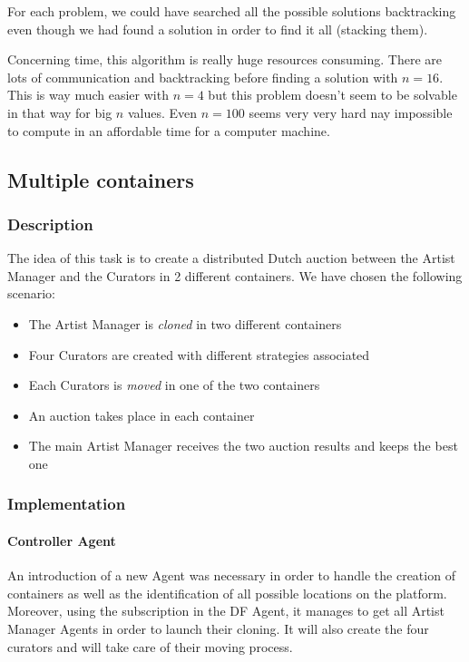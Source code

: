 \documentclass[a4paper,11pt]{article}
\begin{document}
For each problem, we could have searched all the possible solutions backtracking even 
though we had found a solution in order to find it all (stacking them).
  
Concerning time, this algorithm is really huge resources consuming. There are lots of 
communication and backtracking before finding a solution with $n = 16$. This is way much 
easier with $n = 4$ but this problem doesn't seem to be solvable in that way for big $n$ 
values. Even $n = 100$ seems very very hard nay impossible to compute in an affordable 
time for a computer machine.
  

  \subsection{Multiple containers}

  \subsubsection{Description}

  The idea of this task is to create a distributed Dutch auction between the Artist Manager
  and the Curators in 2 different containers.
  We have chosen the following scenario:
  \begin{itemize}
  \item The Artist Manager is \textit{cloned} in two different containers
  \item Four Curators are created with different strategies associated
  \item Each Curators is \textit{moved} in one of the two containers 
  \item An auction takes place in each container
  \item The main Artist Manager receives the two auction results and keeps the best one
  \end{itemize}

  \subsubsection{Implementation}

  \paragraph{Controller Agent}

  An introduction of a new Agent was necessary in order to handle the creation of containers
  as well as the identification of all possible locations on the platform. Moreover, using the
  subscription in the DF Agent, it manages to get all Artist Manager Agents in order to
  launch their cloning. It will also create the four curators and will take care of their
  moving process.
\end{document}
